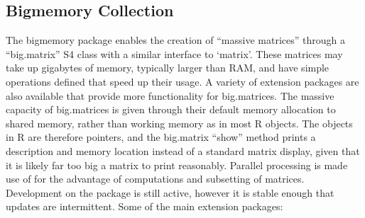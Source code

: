 \hypertarget{sec:bigmemory-collection}{%
    \subsection{Bigmemory Collection}\label{sec:bigmemory-collection}}

The bigmemory package enables the creation of ``massive matrices''
through a ``big.matrix'' S4 class with a similar interface to
`matrix'\cite{kane13:bigmemory}. These matrices may take up gigabytes of
memory, typically larger than RAM, and have simple operations defined
that speed up their usage. A variety of extension packages are also
available that provide more functionality for big.matrices. The massive
capacity of big.matrices is given through their default memory
allocation to shared memory, rather than working memory as in most R
objects. The objects in R are therefore pointers, and the big.matrix
``show'' method prints a description and memory location instead of a
standard matrix display, given that it is likely far too big a matrix to
print reasonably. Parallel processing is made use of for the advantage
of computations and subsetting of matrices. Development on the package
is still active, however it is stable enough that updates are
intermittent. Some of the main extension packages:


